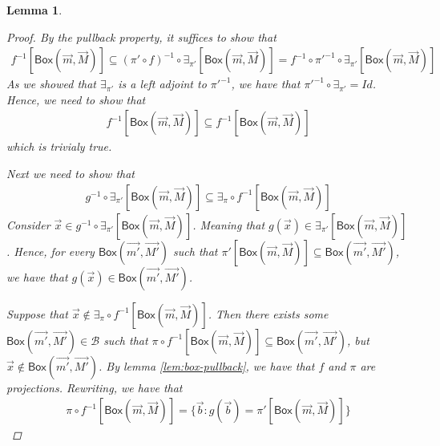 \documentclass[12pt]{article}
\newtheorem{lemma}[theorem]{Lemma}
\newcommand{\bobject}{\mathsf{Box}}
\begin{document}
\begin{lemma}
\begin{proof}
        By the pullback property, it suffices to show that
        \begin{gather*}
            f^{-1}[\bobject(\vec{m},\vec{M})]
            \subseteq
            (\pi'\circ f)^{-1}\circ\exists_{\pi'}[\bobject(\vec{m},\vec{M})]=
            f^{-1}\circ\pi'^{-1}\circ\exists_{\pi'}[\bobject(\vec{m},\vec{M})]
        \end{gather*}
        As we showed that $\exists_{\pi'}$ is a left adjoint to $\pi'^{-1}$, 
        we have that $\pi'^{-1}\circ\exists_{\pi'}=Id$. Hence, we need to show that
        \begin{gather*}
            f^{-1}[\bobject(\vec{m},\vec{M})]
            \subseteq
            f^{-1}[\bobject(\vec{m},\vec{M})]
        \end{gather*}
        which is trivialy true.
        \par Next we need to show that
        \begin{gather*}
            g^{-1}\circ\exists_{\pi'}[\bobject(\vec{m},\vec{M})]
            \subseteq
            \exists_\pi\circ f^{-1}[\bobject(\vec{m},\vec{M})]            
        \end{gather*}
        Consider $\vec{x}\in g^{-1}\circ\exists_{\pi'}[\bobject(\vec{m},\vec{M})]$.
        Meaning that $g(\vec{x})\in\exists_{\pi'}[\bobject(\vec{m},\vec{M})]$.
        Hence, for every $\bobject(\vec{m'},\vec{M'})$
        such that $\pi'[\bobject(\vec{m},\vec{M})]\subseteq\bobject(\vec{m'},\vec{M'})$,
        we have that $g(\vec{x})\in \bobject(\vec{m'},\vec{M'})$.
        \par Suppose that $\vec{x}\notin\exists_\pi\circ f^{-1}[\bobject(\vec{m},\vec{M})]$.
        Then there exists some $\bobject(\vec{m'},\vec{M'})\in\mathcal{B}$
        such that $\pi\circ f^{-1}[\bobject(\vec{m},\vec{M})]\subseteq \bobject(\vec{m'},\vec{M'})$,
        but $\vec{x}\notin\bobject(\vec{m'},\vec{M'})$.
        By lemma \ref{lem:box-pullback}, we have that
        $f$ and $\pi$ are projections.
        Rewriting, we have that
        \begin{gather*}
            \pi\circ f^{-1}[\bobject(\vec{m},\vec{M})]=
            \{\vec{b}:g(\vec{b})=\pi'[\bobject(\vec{m},\vec{M})]\}
        \end{gather*}
    \end{proof}
\end{lemma}
\end{document}
